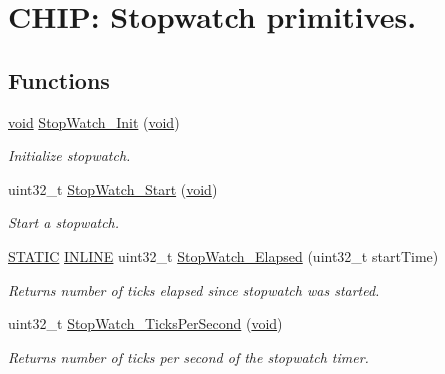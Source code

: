 \hypertarget{group__Stop__Watch}{\section{C\-H\-I\-P\-: Stopwatch primitives.}
\label{group__Stop__Watch}
}
\subsection*{Functions}
\begin{DoxyCompactItemize}
\item 
\hyperlink{Paradigm_2Tern__EE_2small_2portmacro_8h_a14d32f8130d3c0b212cfc751730b5b49}{void} \hyperlink{group__Stop__Watch_gaa0f8ea277b700d20b4322a15d9ddf32c}{Stop\-Watch\-\_\-\-Init} (\hyperlink{Paradigm_2Tern__EE_2small_2portmacro_8h_a14d32f8130d3c0b212cfc751730b5b49}{void})
\begin{DoxyCompactList}\small\item\em Initialize stopwatch. \end{DoxyCompactList}\item 
uint32\-\_\-t \hyperlink{group__Stop__Watch_ga0dbab611d6cbdd4faad5018131aca140}{Stop\-Watch\-\_\-\-Start} (\hyperlink{Paradigm_2Tern__EE_2small_2portmacro_8h_a14d32f8130d3c0b212cfc751730b5b49}{void})
\begin{DoxyCompactList}\small\item\em Start a stopwatch. \end{DoxyCompactList}\item 
\hyperlink{group__LPC__Types__Public__Macros_ga10b2d890d871e1489bb02b7e70d9bdfb}{S\-T\-A\-T\-I\-C} \hyperlink{group__LPC__Types__Public__Types_ga2eb6f9e0395b47b8d5e3eeae4fe0c116}{I\-N\-L\-I\-N\-E} uint32\-\_\-t \hyperlink{group__Stop__Watch_ga0a0b6b9a4391ae5f4fcccb22a2a35f73}{Stop\-Watch\-\_\-\-Elapsed} (uint32\-\_\-t start\-Time)
\begin{DoxyCompactList}\small\item\em Returns number of ticks elapsed since stopwatch was started. \end{DoxyCompactList}\item 
uint32\-\_\-t \hyperlink{group__Stop__Watch_gae780d65d75ed3ca6dbd33389479eed9f}{Stop\-Watch\-\_\-\-Ticks\-Per\-Second} (\hyperlink{Paradigm_2Tern__EE_2small_2portmacro_8h_a14d32f8130d3c0b212cfc751730b5b49}{void})
\begin{DoxyCompactList}\small\item\em Returns number of ticks per second of the stopwatch timer. \end{DoxyCompactList}\item 

\end{DoxyCompactItemize}
